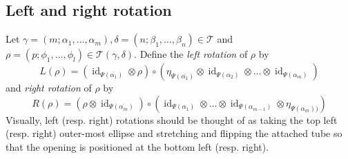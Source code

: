 \documentclass[12pt, a4paper]{amsart}
\def\id{\operatorname{id}}
\def\TT{\mathcal{T}}
\theoremstyle{definition}
\theoremstyle{remark}
\numberwithin{equation}{section}
\begin{document}
\subsection{Left and right rotation}

Let $\gamma = (m;\alpha_1,\dots,\alpha_m), \delta = (n;\beta_1,\dots,\beta_n) \in \TT$ and $\rho = (p;\phi_1,\dots,\phi_l) \in \TT(\gamma,\delta)$. Define the \emph{left rotation} of $\rho$ by
\[
 L(\rho) = (\id_{\Psi(\overline{\alpha_1})} \otimes \rho) \circ (\eta_{\Psi(\overline{\alpha_1})} \otimes \id_{\Psi(\alpha_2)}\otimes\dots\otimes\id_{\Psi(\alpha_m)})
\]
and \emph{right rotation} of $\rho$ by
\[
 R(\rho) = (\rho \otimes \id_{\Psi(\overline{\alpha_m})})\circ (\id_{\Psi(\alpha_1)}\otimes\dots\otimes\id_{\Psi(\alpha_{m-1})}\otimes  \eta_{\Psi(\alpha_m))})
\]
Visually, left (resp. right) rotations should be thought of as taking the top left (resp. right) outer-most ellipse and stretching and flipping the attached tube so that the opening is positioned at the bottom left (resp. right).
\end{document}
